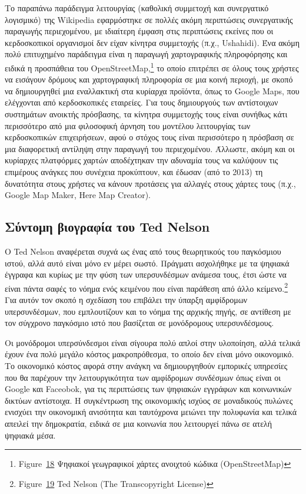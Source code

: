 \documentclass[
]{article}
\begin{document}
Το παραπάνω παράδειγμα λειτουργίας (καθολική συμμετοχή και συνεργατικό
λογισμικό) της Wikipedia εφαρμόστηκε σε πολλές ακόμη περιπτώσεις
συνεργατικής παραγωγής περιεχομένου, με ιδιαίτερη έμφαση στις
περιπτώσεις εκείνες που οι κερδοσκοπικοί οργανισμοί δεν είχαν κίνητρα
συμμετοχής (π.χ., Ushahidi). Ένα ακόμη πολύ επιτυχημένο παράδειγμα είναι
η παραγωγή χαρτογραφικής πληροφόρησης και ειδικά η προσπάθεια του
OpenStreetMap,\footnote{Figure~\protect\hyperlink{fig:open-street-map}{18}
  Ψηφιακοί γεωγραφικοί χάρτες ανοιχτού κώδικα (OpenStreetMap)} το οποίο
επιτρέπει σε όλους τους χρήστες να εισάγουν δρόμους και χαρτογραφική
πληροφορία σε μια κοινή περιοχή, με σκοπό να δημιουργηθεί μια
εναλλακτική στα κυρίαρχα προϊόντα, όπως το Google Maps, που ελέγχονται
από κερδοσκοπικές εταιρείες. Για τους δημιουργούς των αντίστοιχων
συστημάτων ανοικτής πρόσβασης, τα κίνητρα συμμετοχής τους είναι συνήθως
κάτι περισσότερο από μια φιλοσοφική άρνηση του μοντέλου λειτουργίας των
κερδοσκοπικών επιχειρήσεων, αφού ο στόχος τους είναι περισσότερο η
πρόσβαση σε μια διαφορετική αντίληψη στην παραγωγή του περιεχομένου.
Άλλωστε, ακόμη και οι κυρίαρχες πλατφόρμες χαρτών αποδέχτηκαν την
αδυναμία τους να καλύψουν τις επιμέρους ανάγκες που συνέχεια προκύπτουν,
και έδωσαν (από το 2013) τη δυνατότητα στους χρήστες να κάνουν προτάσεις
για αλλαγές στους χάρτες τους (π.χ., Google Map Maker, Here Map
Creator).

\hypertarget{ux3c3ux3cdux3bdux3c4ux3bfux3bcux3b7-ux3b2ux3b9ux3bfux3b3ux3c1ux3b1ux3c6ux3afux3b1-ux3c4ux3bfux3c5-ted-nelson}{%
\subsection{Σύντομη βιογραφία του Ted
Nelson}\label{ux3c3ux3cdux3bdux3c4ux3bfux3bcux3b7-ux3b2ux3b9ux3bfux3b3ux3c1ux3b1ux3c6ux3afux3b1-ux3c4ux3bfux3c5-ted-nelson}}

O Ted Nelson αναφέρεται συχνά ως ένας από τους θεωρητικούς του
παγκόσμιου ιστού, αλλά αυτό είναι μόνο εν μέρει σωστό. Πράγματι
ασχολήθηκε με τα ψηφιακά έγγραφα και κυρίως με την φύση των
υπερσυνδέσμων ανάμεσα τους, έτσι ώστε να είναι πάντα σαφές το νόημα ενός
κειμένου που είναι παράθεση από άλλο κείμενο.\footnote{Figure~\protect\hyperlink{fig:nelson-profile}{19}
  Ted Nelson (The Transcopyright License)} Για αυτόν τον σκοπό η
σχεδίαση του επιβάλει την ύπαρξη αμφίδρομων υπερσυνδέσμων, που
εμπλουτίζουν και το νόημα της αρχικής πηγής, σε αντίθεση με τον σύγχρονο
παγκόσμιο ιστό που βασίζεται σε μονόδρομους υπερσυνδέσμους.

Οι μονόδρομοι υπερσύνδεσμοι είναι σίγουρα πολύ απλοί στην υλοποίηση,
αλλά τελικά έχουν ένα πολύ μεγάλο κόστος μακροπρόθεσμα, το οποίο δεν
είναι μόνο οικονομικό. Το οικονομικό κόστος αφορά στην ανάγκη να
δημιουργηθούν εμπορικές υπηρεσίες που θα παρέχουν την λειτουργικότητα
των αμφίδρομων συνδέσμων όπως είναι οι Google και Faceobok, για τις
περιπτώσεις των ψηφιακών εγγράφων και κοινωνικών δικτύων αντίστοιχα. Η
συγκέντρωση της οικονομικής ισχύος σε μοναδικούς πυλώνες ενισχύει την
οικονομική ανισότητα και ταυτόχρονα μειώνει την πολυφωνία και τελικά
απειλεί την δημοκρατία, ειδικά σε μια κοινωνία που λειτουργεί πάνω σε
ατελή ψηφιακά μέσα.
\end{document}

